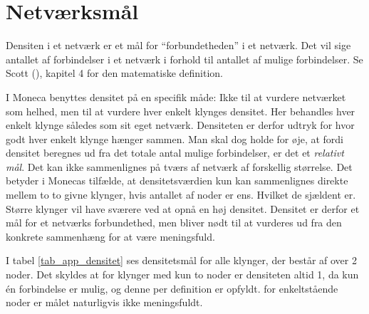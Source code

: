 
\newpage \chapter{Netværksmål \label{app_netvaerksmaal}}


Densiten i et netværk er et mål for “forbundetheden” i et netværk. Det vil sige antallet af forbindelser i et netværk i forhold til antallet af mulige forbindelser. Se Scott (\citeyear{Scott2000}), kapitel 4 for den matematiske definition. 

I Moneca benyttes densitet på en specifik måde: Ikke til at vurdere netværket som helhed, men til at vurdere hver enkelt klynges densitet. Her behandles hver enkelt klynge således som sit eget netværk. Densiteten er derfor udtryk for hvor godt hver enkelt klynge hænger sammen. Man skal dog holde for øje, at fordi densitet beregnes ud fra det totale antal mulige forbindelser, er det et \emph{relativt mål}. Det kan ikke sammenlignes på tværs af netværk af forskellig størrelse. Det betyder i Monecas tilfælde, at densitetsværdien kun kan sammenlignes direkte mellem to to givne klynger, hvis antallet af noder er ens. Hvilket de sjældent er. Større klynger vil have sværere ved at opnå en høj densitet. Densitet er derfor et mål for et netværks forbundethed, men bliver nødt til at vurderes ud fra den konkrete sammenhæng for at være meningsfuld. %

I tabel \ref{tab_app_densitet} ses densitetsmål for alle klynger, der består af over 2 noder. Det skyldes at for klynger med kun to noder er densiteten altid 1, da kun én forbindelse er mulig, og denne per definition er opfyldt. for enkeltstående noder er målet naturligvis ikke meningsfuldt. 

